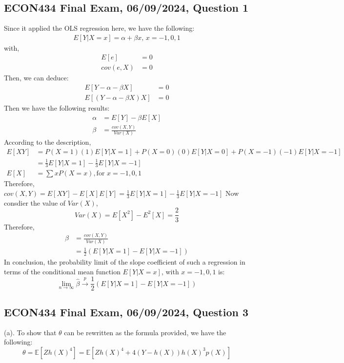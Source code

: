 \documentclass{article}
\begin{document}
\subsection*{ECON434 Final Exam, 06/09/2024, Question 1}
Since it applied the OLS regression here, we have the following:
\begin{align*}
    E[Y|X=x] = \alpha + \beta x \text{, } x=-1,0,1
\end{align*}
with,
\begin{align*}
    E[e] &= 0
    \\cov(e,X) &= 0
\end{align*}
Then, we can deduce:
\begin{align*}
    E[Y-\alpha-\beta X] &= 0
    \\E[(Y-\alpha-\beta X)X]&=0
\end{align*}
Then we have the following results:
\begin{align*}
    \alpha &= E[Y] - \beta E[X] 
    \\ \beta& = \frac{cov(X,Y)}{Var(X)}
\end{align*}
According to the description,
\begin{align*}
    E[XY] &= P(X=1)(1)E[Y|X=1]+P(X=0)(0)E[Y|X=0]+P(X=-1)(-1)E[Y|X=-1]
    \\&= \frac{1}{3}E[Y|X=1]-\frac{1}{3}E[Y|X=-1]
    \\E[X] &= \sum xP(X=x), \text{for $x =-1,0,1$}
\end{align*}
Therefore, $cov(X,Y) = E[XY]-E[X]E[Y] = \frac{1}{3}E[Y|X=1]-\frac{1}{3}E[Y|X=-1]$
Now consdier the value of $Var(X)$,
$$Var(X) = E[X^2]-E^2[X] = \frac{2}{3}$$
Therefore,
\begin{align*}
    \beta &= \frac{cov(X,Y)}{Var(X)}
    \\&=\frac{1}{2}(E[Y|X=1]-E[Y|X=-1])
\end{align*}
In conclusion, the probability limit of the slope coefficient of such a regression in terms of the conditional mean function $E[Y|X=x]$, with $x = -1,0,1$ is:
$$\lim_{n\to \infty}\hat{\beta} \overset{p}{\to} \frac{1}{2}(E[Y|X=1]-E[Y|X=-1])$$

\subsection*{ECON434 Final Exam, 06/09/2024, Question 3}
(a). To show that \( \theta \) can be rewritten as the formula provided, we have the following:  
\[
\theta = \mathbb{E}[Z h(X)^4] = \mathbb{E}[Z h(X)^4 + 4(Y - h(X))h(X)^3 p(X)]
\]
\end{document}
